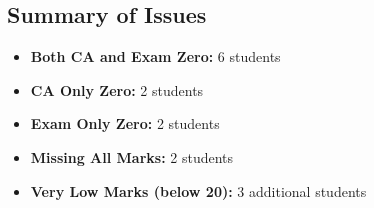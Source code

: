\documentclass[12pt]{article}
\begin{document}
\subsection*{Summary of Issues}
\begin{itemize}
    \item \textbf{Both CA and Exam Zero:} 6 students
    \item \textbf{CA Only Zero:} 2 students
    \item \textbf{Exam Only Zero:} 2 students  
    \item \textbf{Missing All Marks:} 2 students
    \item \textbf{Very Low Marks (below 20):} 3 additional students
\end{itemize}
\end{document}
